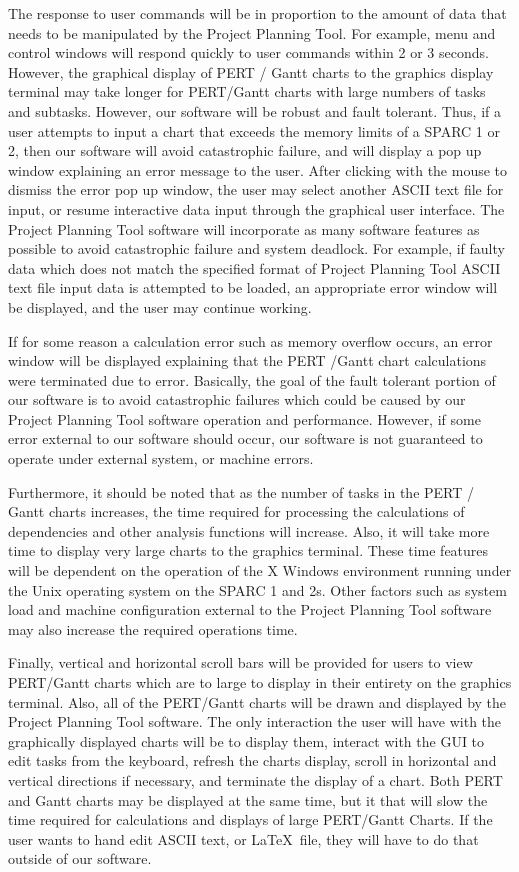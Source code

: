 The response to user commands will be in proportion to the amount of
data that needs to be manipulated by the Project Planning Tool.  For
example, menu and control windows will respond quickly to user
commands within 2 or 3 seconds.  However, the graphical display of
PERT / Gantt charts to the graphics display terminal may take longer
for PERT/Gantt charts with large numbers of tasks and subtasks.
However, our software will be robust and fault tolerant.  Thus, if a
user attempts to input a chart that exceeds the memory limits of a SPARC 1
or 2, then our software will avoid catastrophic failure, and will
display a pop up window explaining an error message to the user.
After clicking with the mouse to dismiss the error pop up window, the
user may select another ASCII text file for input, or resume
interactive data input through the graphical user interface.  The
Project Planning Tool software will incorporate as many software
features as possible to avoid catastrophic failure and system
deadlock.  For example, if faulty data which does not match the
specified format of Project Planning Tool ASCII text file input data
is attempted to be loaded, an appropriate error window will be
displayed, and the user may continue working.

If for some reason a calculation error such as memory overflow occurs,
an error window will be displayed explaining that the PERT /Gantt
chart calculations were terminated due to error. Basically, the goal
of the fault tolerant portion of our software is to avoid catastrophic
failures which could be caused by our Project Planning Tool software
operation and performance.  However, if some error external to our
software should occur, our software is not guaranteed to operate under
external system, or machine errors.

Furthermore, it should be noted that as the number of tasks in the
PERT / Gantt charts increases, the time required for processing the
calculations of dependencies and other analysis functions will
increase.  Also, it will take more time to display very large charts
to the graphics terminal.  These time features will be dependent on
the operation of the X Windows environment running under the Unix
operating system on the SPARC 1 and 2s.  Other factors such as system
load and machine configuration external to the Project Planning Tool
software may also increase the required operations time.

Finally, vertical and horizontal scroll bars will be provided for
users to view PERT/Gantt charts which are to large to display in
their entirety on the graphics terminal.  Also, all of the PERT/Gantt
charts will be drawn and displayed by the Project Planning Tool
software.  The only interaction the user will have with the
graphically displayed charts will be to display them, interact with
the GUI to edit tasks from the keyboard, refresh the charts display,
scroll in horizontal and vertical directions if necessary, and
terminate the display of a chart.  Both PERT and Gantt charts may be
displayed at the same time, but it that will slow the time required
for calculations and displays of large PERT/Gantt Charts.  If the user
wants to hand edit ASCII text, or \LaTeX\ file, they will have to do
that outside of our software.

